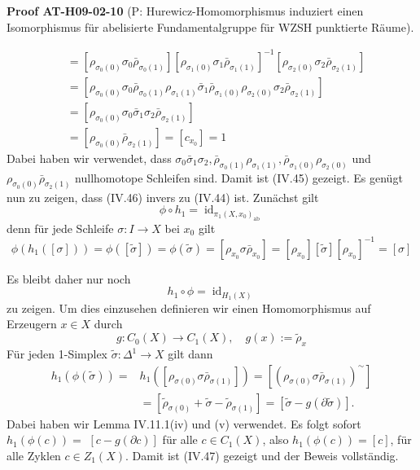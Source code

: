 \documentclass[10pt, letterpaper]{article}
\newcommand{\CustomHeading}[3]{%
  \par\medskip\noindent%
  \textbf{#1 #2} \textnormal{(#3)}.\enskip%
}
\newenvironment{PROOF}[2]{\CustomHeading{Proof}{#1}{#2}}{}
\begin{document}
\begin{PROOF}{AT-H09-02-10}{P: Hurewicz-Homomorphismus induziert einen Isomorphismus für abelisierte Fundamentalgruppe für WZSH punktierte Räume}
$$\begin{aligned}
& =\left[\rho_{\sigma_0(0)} \sigma_0 \bar{\rho}_{\sigma_0(1)}\right]\left[\rho_{\sigma_1(0)} \sigma_1 \bar{\rho}_{\sigma_1(1)}\right]^{-1}\left[\rho_{\sigma_2(0)} \sigma_2 \bar{\rho}_{\sigma_2(1)}\right] \\
& =\left[\rho_{\sigma_0(0)} \sigma_0 \bar{\rho}_{\sigma_0(1)} \rho_{\sigma_1(1)} \bar{\sigma}_1 \bar{\rho}_{\sigma_1(0)} \rho_{\sigma_2(0)} \sigma_2 \bar{\rho}_{\sigma_2(1)}\right] \\
& =\left[\rho_{\sigma_0(0)} \sigma_0 \bar{\sigma}_1 \sigma_2 \bar{\rho}_{\sigma_2(1)}\right] \\
& =\left[\rho_{\sigma_0(0)} \bar{\rho}_{\sigma_2(1)}\right]=\left[c_{x_0}\right]=1
\end{aligned}
$$
Dabei haben wir verwendet, dass $\sigma_0 \bar{\sigma}_1 \sigma_2, \bar{\rho}_{\sigma_0(1)} \rho_{\sigma_1(1)}, \bar{\rho}_{\sigma_1(0)} \rho_{\sigma_2(0)}$ und $\rho_{\sigma_0(0)} \bar{\rho}_{\sigma_2(1)}$ nullhomotope Schleifen sind. Damit ist (IV.45) gezeigt. Es genügt nun zu zeigen, dass (IV.46) invers zu (IV.44) ist. Zunächst gilt
$$
\phi \circ h_1=\operatorname{id}_{\pi_1\left(X, x_0\right)_{\mathrm{ab}}}
$$
denn für jede Schleife $\sigma: I \rightarrow X$ bei $x_0$ gilt
$$
\phi\left(h_1([\sigma])\right)=\phi([\tilde{\sigma}])=\phi(\tilde{\sigma})=\left[\rho_{x_0} \sigma \bar{\rho}_{x_0}\right]=\left[\rho_{x_0}\right][\tilde{\sigma}]\left[\rho_{x_0}\right]^{-1}=[\sigma]
$$

Es bleibt daher nur noch
$$
h_1 \circ \phi=\operatorname{id}_{H_1(X)}
$$
zu zeigen. Um dies einzusehen definieren wir einen Homomorphismus auf Erzeugern $x \in X$ durch
$$
g: C_0(X) \rightarrow C_1(X), \quad g(x):=\tilde{\rho}_x
$$
Für jeden 1-Simplex $\tilde{\sigma}: \Delta^1 \rightarrow X$ gilt dann
$$
\begin{aligned}
h_1(\phi(\tilde{\sigma}))= & h_1\left(\left[\rho_{\sigma(0)} \sigma \bar{\rho}_{\sigma(1)}\right]\right)=\left[\left(\rho_{\sigma(0)} \sigma \bar{\rho}_{\sigma(1)}\right)^{\sim}\right] \\
& =\left[\tilde{\rho}_{\sigma(0)}+\tilde{\sigma}-\tilde{\rho}_{\sigma(1)}\right]=[\tilde{\sigma}-g(\partial \tilde{\sigma})] .
\end{aligned}
$$
Dabei haben wir Lemma IV.11.1(iv) und (v) verwendet. Es folgt sofort $h_1(\phi(c))=$ $[c-g(\partial c)]$ für alle $c \in C_1(X)$, also $h_1(\phi(c))=[c]$, für alle Zyklen $c \in Z_1(X)$. Damit ist (IV.47) gezeigt und der Beweis vollständig.
\end{PROOF}
\end{document}
